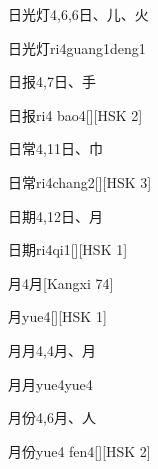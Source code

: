 \begin{entry}{日光灯}{4,6,6}{⽇、⼉、⽕}
  \begin{phonetics}{日光灯}{ri4guang1deng1}
  \end{phonetics}
\end{entry}

\begin{entry}{日报}{4,7}{⽇、⼿}
  \begin{phonetics}{日报}{ri4 bao4}[][HSK 2]
  \end{phonetics}
\end{entry}

\begin{entry}{日常}{4,11}{⽇、⼱}
  \begin{phonetics}{日常}{ri4chang2}[][HSK 3]
  \end{phonetics}
\end{entry}

\begin{entry}{日期}{4,12}{⽇、⽉}
  \begin{phonetics}{日期}{ri4qi1}[][HSK 1]
  \end{phonetics}
\end{entry}

\begin{entry}{月}{4}{⽉}[Kangxi 74]
  \begin{phonetics}{月}{yue4}[][HSK 1]
  \end{phonetics}
\end{entry}

\begin{entry}{月月}{4,4}{⽉、⽉}
  \begin{phonetics}{月月}{yue4yue4}
  \end{phonetics}
\end{entry}

\begin{entry}{月份}{4,6}{⽉、⼈}
  \begin{phonetics}{月份}{yue4 fen4}[][HSK 2]
  \end{phonetics}
\end{entry}

